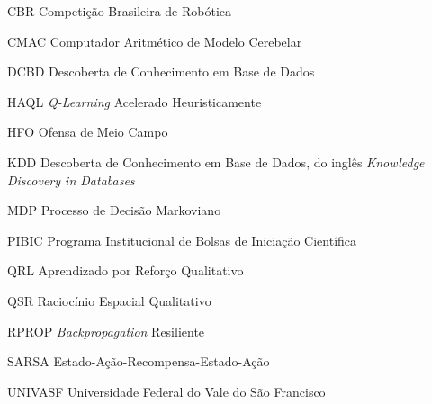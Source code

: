 \begin{siglas}
	\item[CBR] Competição Brasileira de Robótica
    \item[CMAC] Computador Aritmético de Modelo Cerebelar
    \item[DCBD] Descoberta de Conhecimento em Base de Dados 
    \item[HAQL] \textit{Q-Learning} Acelerado Heuristicamente
    \item[HFO] Ofensa de Meio Campo
    \item[KDD] Descoberta de Conhecimento em Base de Dados, do inglês \textit{Knowledge Discovery in Databases}
    \item[MDP] Processo de Decisão Markoviano
    \item[PIBIC] Programa Institucional de Bolsas de Iniciação Científica 
    \item[QRL] Aprendizado por Reforço Qualitativo
    \item[QSR] Raciocínio Espacial Qualitativo
    \item[RPROP] \textit{Backpropagation} Resiliente
    \item[SARSA] Estado-Ação-Recompensa-Estado-Ação
    \item[UNIVASF] Universidade Federal do Vale do São Francisco
	    
\end{siglas}

\tableofcontents*
\cleardoublepage
